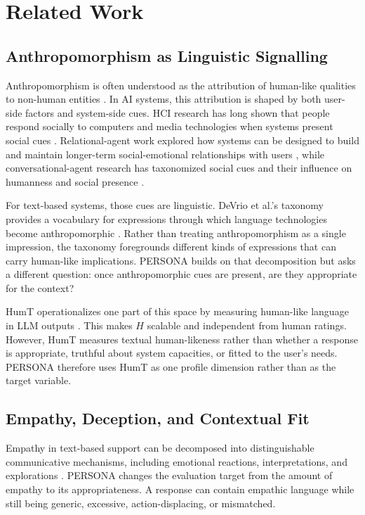 \documentclass[manuscript,review,anonymous]{acmart}
\begin{document}
\section{Related Work}

\subsection{Anthropomorphism as Linguistic Signalling}

Anthropomorphism is often understood as the attribution of human-like qualities to non-human entities \cite{epley2007,waytz2010,epley2008}. In AI systems, this attribution is shaped by both user-side factors and system-side cues. HCI research has long shown that people respond socially to computers and media technologies when systems present social cues \cite{nass1994,reeves1996,nass2000}. Relational-agent work explored how systems can be designed to build and maintain longer-term social-emotional relationships with users \cite{bickmore2005}, while conversational-agent research has taxonomized social cues and their influence on humanness and social presence \cite{feine2019,araujo2018,go2019}.

For text-based systems, those cues are linguistic. DeVrio et al.'s taxonomy provides a vocabulary for expressions through which language technologies become anthropomorphic \cite{devrio2025}. Rather than treating anthropomorphism as a single impression, the taxonomy foregrounds different kinds of expressions that can carry human-like implications. PERSONA builds on that decomposition but asks a different question: once anthropomorphic cues are present, are they appropriate for the context?

HumT operationalizes one part of this space by measuring human-like language in LLM outputs \cite{cheng2025}. This makes $H$ scalable and independent from human ratings. However, HumT measures textual human-likeness rather than whether a response is appropriate, truthful about system capacities, or fitted to the user's needs. PERSONA therefore uses HumT as one profile dimension rather than as the target variable.

\subsection{Empathy, Deception, and Contextual Fit}

Empathy in text-based support can be decomposed into distinguishable communicative mechanisms, including emotional reactions, interpretations, and explorations \cite{sharma2020}. PERSONA changes the evaluation target from the amount of empathy to its appropriateness. A response can contain empathic language while still being generic, excessive, action-displacing, or mismatched.
\end{document}
